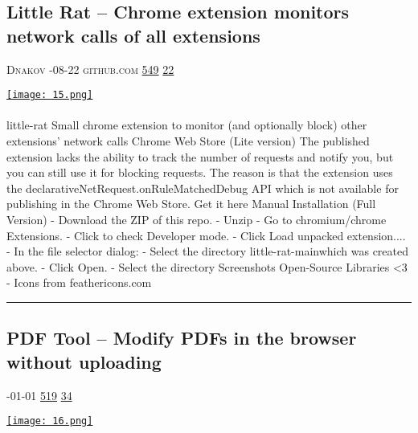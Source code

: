 \documentclass[10pt,a4paper]{article}
\begin{document}
\begin{multicols*}{2}
\begin{minipage}{\linewidth}
\subsection{Little Rat – Chrome extension monitors network calls of all extensions}
\textsc{\footnotesize
{\scriptsize\faUser}\space 
Dnakov 
{\scriptsize\faCalendar}-08-22 
{\scriptsize\faGithub}\space 
github.com 
{\scriptsize\faThumbsOUp}\space 
\href{http://news.ycombinator.com/item?id=37119942\&utm\_term=comment}{549} 
{\scriptsize\faComments}\space 
\href{http://news.ycombinator.com/item?id=37119942\&utm\_term=comment}{22} 
}
\par\medskip\noindent
\href{https://github.com/dnakov/little-rat?utm\_source=hackernewsletter\&utm\_medium=email\&utm\_term=show\_hn}{
    \texttt{[image: 15.png]}
}
\end{minipage}
\paragraph{}
little-rat
 Small chrome extension to monitor (and optionally block) other extensions' network calls
Chrome Web Store (Lite version)
The published extension lacks the ability to track the number of requests and notify you, but you can still use it for blocking requests. The reason is that the extension uses the
declarativeNetRequest.onRuleMatchedDebug API which is not available for publishing in the Chrome Web Store.
Get it here
Manual Installation (Full Version)
- Download the ZIP of this repo.
- Unzip
- Go to chromium/chrome Extensions.
- Click to check Developer mode.
- Click Load unpacked extension....
- In the file selector dialog:
- Select the directory
little-rat-mainwhich was created above.
- Click Open.
- Select the directory
Screenshots
Open-Source Libraries <3
- Icons from feathericons.com
\par\noindent\textcolor{red}{\rule{\linewidth}{0.2mm}}
\vfill
\null
\noindent\begin{minipage}{\linewidth}
\subsection{PDF Tool – Modify PDFs in the browser without uploading}
\textsc{\footnotesize
{\scriptsize\faCalendar}-01-01 
{\scriptsize\faThumbsOUp}\space 
\href{http://news.ycombinator.com/item?id=37110628\&utm\_term=comment}{519} 
{\scriptsize\faComments}\space 
\href{http://news.ycombinator.com/item?id=37110628\&utm\_term=comment}{34} 
}
\par\medskip\noindent
\href{https://www.pdftool.org?utm\_source=hackernewsletter\&utm\_medium=email\&utm\_term=show\_hn}{
    \texttt{[image: 16.png]}
}
\end{minipage}

\end{multicols*}
\end{document}
